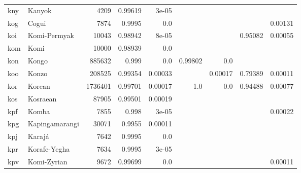 \documentclass[11pt]{article}
\begin{document}
\begin{table*}[h]
{\begin{tabular}{llrrrrrrr}
kny         & Kanyok         & 4209         & 0.99619         & 3e-05         &          &          &          &          \\

kog         & Cogui         & 7874         & 0.9995         & 0.0         &          &          &          & 0.00131         \\

koi         & Komi-Permyak         & 10043         & 0.98942         & 8e-05         &          &          & 0.95082         & 0.00055         \\

kom         & Komi         & 10000         & 0.98939         & 0.0         &          &          &          &          \\

kon         & Kongo         & 885632         & 0.999         & 0.0         & 0.99802         & 0.0         &          &          \\

koo         & Konzo         & 208525         & 0.99354         & 0.00033         &          & 0.00017         & 0.79389         & 0.00011         \\

kor         & Korean         & 1736401         & 0.99701         & 0.00017         & 1.0         & 0.0         & 0.94488         & 0.00077         \\

kos         & Kosraean         & 87905         & 0.99501         & 0.00019         &          &          &          &          \\

kpf         & Komba         & 7855         & 0.998         & 3e-05         &          &          &          & 0.00022         \\

kpg         & Kapingamarangi         & 30071         & 0.9955         & 0.00011         &          &          &          &          \\

kpj         & Karajá         & 7642         & 0.9995         & 0.0         &          &          &          &          \\

kpr         & Korafe-Yegha         & 7634         & 0.9995         & 3e-05         &          &          &          &          \\

kpv         & Komi-Zyrian         & 9672         & 0.99699         & 0.0         &          &          &          & 0.00011         \\


\end{tabular}}
\end{table*}
\end{document}
